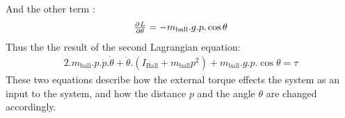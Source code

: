 \documentclass{article}
\begin{document}
And the other term :
\begin{equation}
	\begin{split}
		\pd{L}{\theta} = -m_{\text{ball}}.g.p.\cos{\theta}
	\end{split}
\end{equation}
Thus the the result of the second Lagrangian equation:
\begin{equation}
	\begin{split}
		2.m_{\text{ball}}.p.\dot{p}.\dot{\theta} + \ddot{\theta}.(I_{\text{Ball}} + m_{\text{ball}} p^2) + m_{\text{ball}}.g.p.\cos{\theta}  = \tau
	\end{split}
\end{equation}
These two equations describe how the external torque effects the system as an input to the system, and how the distance $p$ and the angle $\theta$ are changed accordingly.
\newpage
\end{document}
